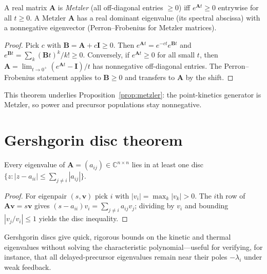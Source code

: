 \begin{theorem}
A real matrix $\mathbf A$ is \emph{Metzler} (all off-diagonal entries $\ge0$) iff
$e^{\mathbf A t}\ge0$ entrywise for all $t\ge0$. A Metzler $\mathbf A$ has a real
dominant eigenvalue (its spectral abscissa) with a nonnegative eigenvector
(Perron--Frobenius for Metzler matrices).
\end{theorem}
\begin{proof}
Pick $c$ with $\mathbf B=\mathbf A+c\mathbf I\ge0$. Then $e^{\mathbf A t}=
e^{-ct}e^{\mathbf B t}$ and $e^{\mathbf B t}=\sum_k(\mathbf B t)^k/k!\ge0$.
Conversely, if $e^{\mathbf A t}\ge0$ for all small $t$, then
$\mathbf A=\lim_{t\to0^+}(e^{\mathbf A t}-\mathbf I)/t$ has nonnegative
off-diagonal entries. The Perron--Frobenius statement applies to $\mathbf B\ge0$
and transfers to $\mathbf A$ by the shift.
\end{proof}

This theorem underlies Proposition~\ref{prop:metzler}: the point-kinetics
generator is Metzler, so power and precursor populations stay nonnegative.

\section{Gershgorin disc theorem}

\begin{theorem}[Gershgorin]
Every eigenvalue of $\mathbf A=(a_{ij})\in\mathbb C^{n\times n}$ lies in at least
one disc $\{z:|z-a_{ii}|\le\sum_{j\ne i}|a_{ij}|\}$.
\end{theorem}
\begin{proof}
For eigenpair $(s,\mathbf v)$ pick $i$ with $|v_i|=\max_k|v_k|>0$. The $i$th row of
$\mathbf A\mathbf v=s\mathbf v$ gives $(s-a_{ii})v_i=\sum_{j\ne i}a_{ij}v_j$;
dividing by $v_i$ and bounding $|v_j/v_i|\le1$ yields the disc inequality.
\end{proof}

Gershgorin discs give quick, rigorous bounds on the kinetic and thermal
eigenvalues without solving the characteristic polynomial---useful for verifying,
for instance, that all delayed-precursor eigenvalues remain near their poles
$-\lambda_i$ under weak feedback.
